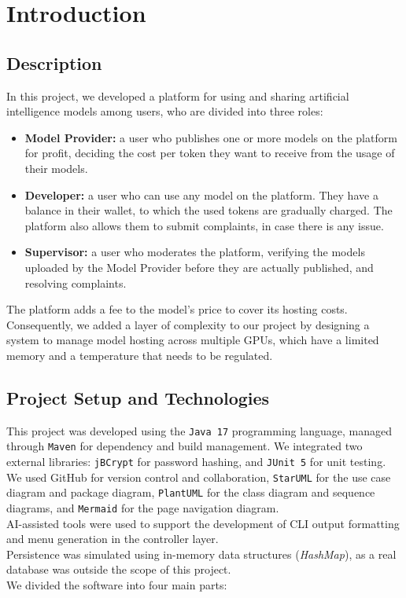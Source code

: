 \documentclass[a4paper,11pt]{report}
\begin{document}
    

    \tableofcontents
    \chapter{Introduction}
    
    \section{Description}
    In this project, we developed a platform for using and sharing artificial intelligence models among users, who are divided into three roles:
    \begin{itemize}
        \item \textbf{Model Provider:} a user who publishes one or more models on the platform for profit, deciding the cost per token they want to receive from the usage of their models.
        \item \textbf{Developer:} a user who can use any model on the platform. They have a balance in their wallet, to which the used tokens are gradually charged. The platform also allows them to submit complaints, in case there is any issue.
        \item \textbf{Supervisor:} a user who moderates the platform, verifying the models uploaded by the Model Provider before they are actually published, and resolving complaints.
    \end{itemize}

    The platform adds a fee to the model's price to cover its hosting costs. 
    Consequently, we added a layer of complexity to our project by designing a system to manage model hosting across multiple GPUs,
    which have a limited memory and a temperature that needs to be regulated. 
    \section{Project Setup and Technologies}
    \label{sec:Architecture}
    This project was developed using the \texttt{Java 17} programming language, managed through \texttt{Maven} for dependency and build management. 
	We integrated two external libraries: \texttt{jBCrypt} for password hashing, and \texttt{JUnit 5} for unit testing. 
	We used GitHub for version control and collaboration, \texttt{StarUML} for the use case diagram and package diagram, \texttt{PlantUML} for the class diagram and sequence diagrams, and \texttt{Mermaid} for the page navigation diagram.
    \\ AI-assisted tools were used to support the development of CLI output formatting and menu generation in the controller layer.  
	\\ Persistence was simulated using in-memory data structures (\textit{HashMap}), as a real database was outside the scope of this project.
    \\ We divided the software into four main parts:
    
\end{document}
